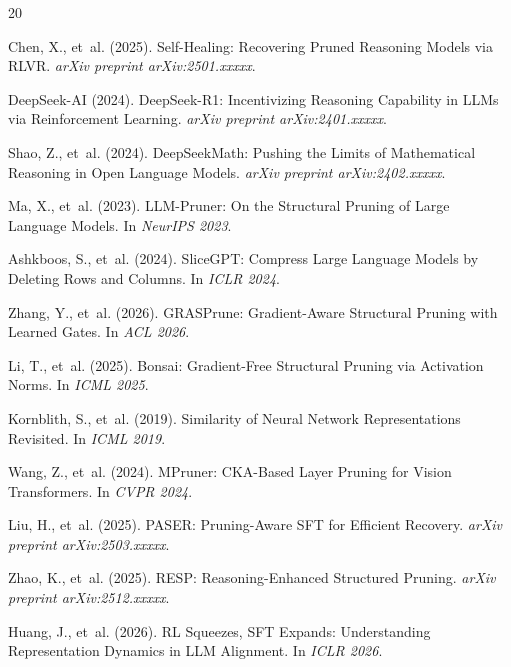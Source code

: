 \documentclass[11pt,a4paper]{article}
\begin{document}

\begin{thebibliography}{20}

Chen, X., et~al. (2025).
\newblock Self-Healing: Recovering Pruned Reasoning Models via RLVR.
\newblock \emph{arXiv preprint arXiv:2501.xxxxx}.

DeepSeek-AI (2024).
\newblock DeepSeek-R1: Incentivizing Reasoning Capability in LLMs via Reinforcement Learning.
\newblock \emph{arXiv preprint arXiv:2401.xxxxx}.

Shao, Z., et~al. (2024).
\newblock DeepSeekMath: Pushing the Limits of Mathematical Reasoning in Open Language Models.
\newblock \emph{arXiv preprint arXiv:2402.xxxxx}.

Ma, X., et~al. (2023).
\newblock LLM-Pruner: On the Structural Pruning of Large Language Models.
\newblock In \emph{NeurIPS 2023}.

Ashkboos, S., et~al. (2024).
\newblock SliceGPT: Compress Large Language Models by Deleting Rows and Columns.
\newblock In \emph{ICLR 2024}.

Zhang, Y., et~al. (2026).
\newblock GRASPrune: Gradient-Aware Structural Pruning with Learned Gates.
\newblock In \emph{ACL 2026}.

Li, T., et~al. (2025).
\newblock Bonsai: Gradient-Free Structural Pruning via Activation Norms.
\newblock In \emph{ICML 2025}.

Kornblith, S., et~al. (2019).
\newblock Similarity of Neural Network Representations Revisited.
\newblock In \emph{ICML 2019}.

Wang, Z., et~al. (2024).
\newblock MPruner: CKA-Based Layer Pruning for Vision Transformers.
\newblock In \emph{CVPR 2024}.

Liu, H., et~al. (2025).
\newblock PASER: Pruning-Aware SFT for Efficient Recovery.
\newblock \emph{arXiv preprint arXiv:2503.xxxxx}.

Zhao, K., et~al. (2025).
\newblock RESP: Reasoning-Enhanced Structured Pruning.
\newblock \emph{arXiv preprint arXiv:2512.xxxxx}.

Huang, J., et~al. (2026).
\newblock RL Squeezes, SFT Expands: Understanding Representation Dynamics in LLM Alignment.
\newblock In \emph{ICLR 2026}.

\end{thebibliography}
\end{document}
